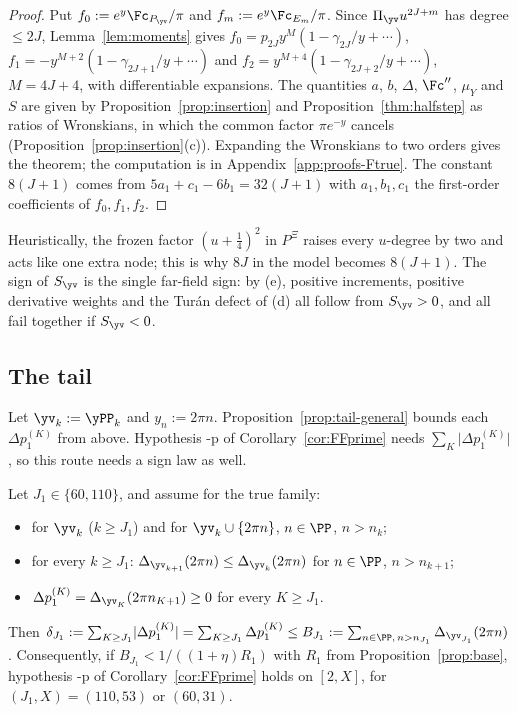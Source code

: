 \begin{proof}
Put $f_0:=e^y\Fc_{P_{\yv}}/\pi$ and $f_m:=e^y\Fc_{E_m}/\pi$. Since $\Pi_{\yv}u^{2J+m}$ has degree $\le2J$,
Lemma~\ref{lem:moments} gives $f_0=p_{2J}y^{M}(1-\gamma_{2J}/y+\cdots)$, $f_1=-y^{M+2}(1-\gamma_{2J+1}/y+\cdots)$ and
$f_2=y^{M+4}(1-\gamma_{2J+2}/y+\cdots)$, $M=4J+4$, with differentiable expansions. The quantities $a$, $b$, $\Delta$,
$\Fc''$, $\mu_Y$ and $S$ are given by Proposition~\ref{prop:insertion} and Proposition~\ref{thm:halfstep} as ratios of
Wronskians, in which the common factor $\pi e^{-y}$ cancels (Proposition~\ref{prop:insertion}(c)). Expanding the
Wronskians to two orders gives the theorem; the computation is in Appendix~\ref{app:proofs-Ftrue}. The constant
$8(J+1)$ comes from $5a_1+c_1-6b_1=32(J+1)$ with $a_1,b_1,c_1$ the first-order coefficients of $f_0,f_1,f_2$.
\end{proof}

Heuristically, the frozen factor $(u+\frac14)^2$ in $P^\Xi$ raises every $u$-degree by two and acts like one extra node;
this is why $8J$ in the model becomes $8(J+1)$. The sign of $S_{\yv}$ is the single far-field sign: by (e), positive
increments, positive derivative weights and the Tur\'an defect of (d) all follow from $S_{\yv}>0$, and all fail together
if $S_{\yv}<0$.

\subsection{The tail}\label{ssec:tailbound}

Let $\yv_k:=\yPP_k$ and $y_n:=2\pi n$. Proposition~\ref{prop:tail-general} bounds each $\Delta p_1^{(K)}$ from above.
Hypothesis \hyp{p} of Corollary~\ref{cor:FFprime} needs $\sum_K\lvert\Delta p_1^{(K)}\rvert$, so this route needs a sign law as well.

\begin{theorem}\label{thm:TBtrue}
Let $J_1\in\{60,110\}$, and assume for the true family:
\begin{itemize}[leftmargin=5.5em]
\item[\hyp{N}] for $\yv_k$ ($k\ge J_1$) and for $\yv_k\cup\{2\pi n\}$, $n\in\PP$, $n>n_k$;
\item[\hyp{SM}$_{\mathrm{true}}$] for every $k\ge J_1$: $\Delta_{\yv_{k+1}}(2\pi n)\le\Delta_{\yv_k}(2\pi n)$ for $n\in\PP$, $n>n_{k+1}$;
\item[\hyp{W}$_{\mathrm{top}}$] $\Delta p_1^{(K)}=\Delta_{\yv_K}(2\pi n_{K+1})\ge0$ for every $K\ge J_1$.
\end{itemize}
Then $\delta_{J_1}:=\sum_{K\ge J_1}\lvert\Delta p_1^{(K)}\rvert=\sum_{K\ge J_1}\Delta p_1^{(K)}\le B_{J_1}:=\sum_{n\in\PP,\,n>n_{J_1}}\Delta_{\yv_{J_1}}(2\pi n)$.
Consequently, if $B_{J_1}<1/((1+\eta)R_1)$ with $R_1$ from Proposition~\ref{prop:base}, hypothesis \hyp{p} of
Corollary~\ref{cor:FFprime} holds on $[2,X]$, for $(J_1,X)=(110,53)$ or $(60,31)$.
\end{theorem}

